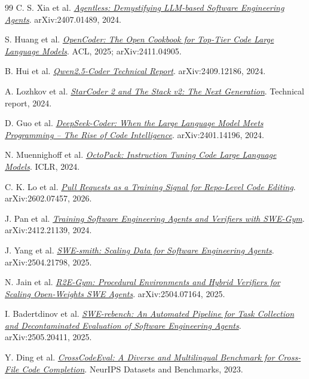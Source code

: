 \documentclass[10pt,a4paper,UTF8,fontset=none]{ctexart}
\begin{document}
\begin{thebibliography}{99}
C. S. Xia et al. \href{https://arxiv.org/abs/2407.01489}{\textit{Agentless: Demystifying LLM-based Software Engineering Agents}}. arXiv:2407.01489, 2024.

S. Huang et al. \href{https://arxiv.org/abs/2411.04905}{\textit{OpenCoder: The Open Cookbook for Top-Tier Code Large Language Models}}. ACL, 2025; arXiv:2411.04905.

B. Hui et al. \href{https://arxiv.org/abs/2409.12186}{\textit{Qwen2.5-Coder Technical Report}}. arXiv:2409.12186, 2024.

A. Lozhkov et al. \href{https://arxiv.org/abs/2402.19173}{\textit{StarCoder 2 and The Stack v2: The Next Generation}}. Technical report, 2024.

D. Guo et al. \href{https://arxiv.org/abs/2401.14196}{\textit{DeepSeek-Coder: When the Large Language Model Meets Programming -- The Rise of Code Intelligence}}. arXiv:2401.14196, 2024.

N. Muennighoff et al. \href{https://arxiv.org/abs/2308.07124}{\textit{OctoPack: Instruction Tuning Code Large Language Models}}. ICLR, 2024.

C. K. Lo et al. \href{https://arxiv.org/abs/2602.07457}{\textit{Pull Requests as a Training Signal for Repo-Level Code Editing}}. arXiv:2602.07457, 2026.

J. Pan et al. \href{https://arxiv.org/abs/2412.21139}{\textit{Training Software Engineering Agents and Verifiers with SWE-Gym}}. arXiv:2412.21139, 2024.

J. Yang et al. \href{https://arxiv.org/abs/2504.21798}{\textit{SWE-smith: Scaling Data for Software Engineering Agents}}. arXiv:2504.21798, 2025.

N. Jain et al. \href{https://arxiv.org/abs/2504.07164}{\textit{R2E-Gym: Procedural Environments and Hybrid Verifiers for Scaling Open-Weights SWE Agents}}. arXiv:2504.07164, 2025.

I. Badertdinov et al. \href{https://arxiv.org/abs/2505.20411}{\textit{SWE-rebench: An Automated Pipeline for Task Collection and Decontaminated Evaluation of Software Engineering Agents}}. arXiv:2505.20411, 2025.

Y. Ding et al. \href{https://arxiv.org/abs/2310.11248}{\textit{CrossCodeEval: A Diverse and Multilingual Benchmark for Cross-File Code Completion}}. NeurIPS Datasets and Benchmarks, 2023.


\end{thebibliography}
\end{document}
